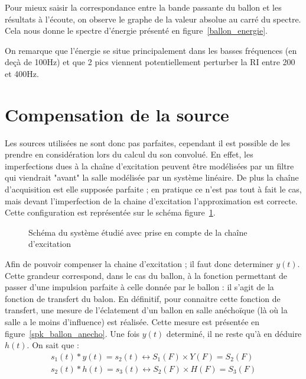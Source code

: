 Pour mieux saisir la correspondance entre la bande passante du ballon et les résultats à l'écoute, on observe le graphe
de la valeur absolue au carré du spectre. Cela nous donne le spectre d'énergie présenté en figure~\ref{ballon_energie}.

On remarque que l'énergie se situe principalement dans les basses fréquences (en deçà de 100Hz) et que 2 pics viennent
potentiellement perturber la RI entre 200 et 400Hz.

\section{Compensation de la source} %

Les sources utilisées ne sont donc pas parfaites, cependant il est possible de les prendre en considération lors du calcul du son convolué.
En effet, les imperfections dues à la chaîne d'excitation peuvent être modélisées par un filtre qui viendrait "avant" la salle modélisée par un système linéaire. De plus la chaîne d'acquisition est elle supposée parfaite ; en pratique ce n'est pas tout à fait le cas, mais devant l'imperfection de la chaine d'excitation l'approximation est correcte. Cette configuration est représentée sur le schéma figure~\ref{compensation}.
\begin{figure}[h!]
\caption{\label{compensation}Schéma du système étudié avec prise en compte de la chaîne d'excitation}
\end{figure}
Afin de pouvoir compenser la chaine d'excitation ; il faut donc determiner $y(t)$. Cette grandeur correspond, dans le cas du ballon, à la fonction permettant de passer d'une impulsion parfaite à celle donnée par le ballon : il s'agit de la fonction de transfert du balon. En définitif, pour connaitre cette fonction de transfert, une mesure de l'éclatement d'un ballon en salle anéchoïque (là où la salle a le moins d'influence) est réalisée. Cette mesure est présentée en figure~\ref{spk_ballon_anecho}.
Une fois $y(t)$ determiné, il ne reste qu'à en déduire $h(t)$.
On sait que :
\begin{eqnarray*}
s_1 (t) \ast y(t) = s_2 (t) \leftrightarrow S_1 (F) \times Y(F) = S_2 (F)\\
s_2 (t) \ast h (t) = s_3 (t) \leftrightarrow S_2 (F) \times H(F) = S_3 (F)
\end{eqnarray*}
